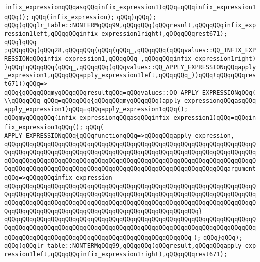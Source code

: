 \verb|infix_expressionqQQqasqQQqinfix_expression1)qQQq=qQQqinfix_expression1qQQq();|\newline
\verb|qQQq(infix_expression);|\newline
\verb|qQQq}qQQq);|\newline
\verb|qQQq(qQQqlr_table::NONTERMqQQq99,qQQqqQQq(qQQqresult,qQQqqQQqinfix_expression1left,qQQqqQQqinfix_expression1right),qQQqqQQqrest671);|\newline
\verb|qQQq}qQQq|\newline
\verb|;qQQqqQQq(qQQq28,qQQqqQQq(qQQq(qQQq_,qQQqqQQq(qQQqvalues::QQ_INFIX_EXPRESSIONqQQqinfix_expression1,qQQqqQQq_,qQQqqQQqinfix_expression1right))qQQq!qQQqqQQq(qQQq_,qQQqqQQq(qQQqvalues::QQ_APPLY_EXPRESSIONqQQqapply_expression1,qQQqqQQqapply_expression1left,qQQqqQQq_))qQQq!qQQqqQQqrest671))qQQq=>|\newline
\verb|qQQq{qQQqqQQqmyqQQqqQQqresultqQQq=qQQqvalues::QQ_APPLY_EXPRESSIONqQQq(\\qQQqqQQq_qQQq=qQQqqQQq{qQQqqQQqmyqQQqqQQq(apply_expressionqQQqasqQQqapply_expression1)qQQq=qQQqapply_expression1qQQq();|\newline
\verb|qQQqmyqQQqqQQq(infix_expressionqQQqasqQQqinfix_expression1)qQQq=qQQqinfix_expression1qQQq();|\newline
\verb|qQQq(|\newline
\verb|APPLY_EXPRESSIONqQQq{qQQqfunctionqQQq=>qQQqqQQqapply_expression,|\newline
\verb|qQQqqQQqqQQqqQQqqQQqqQQqqQQqqQQqqQQqqQQqqQQqqQQqqQQqqQQqqQQqqQQqqQQqqQQqqQQqqQQqqQQqqQQqqQQqqQQqqQQqqQQqqQQqqQQqqQQqqQQqqQQqqQQqqQQqqQQqqQQqqQQqqQQqqQQqqQQqqQQqqQQqqQQqqQQqqQQqqQQqqQQqqQQqqQQqqQQqqQQqqQQqqQQqqQQqqQQqqQQqqQQqqQQqqQQqqQQqqQQqqQQqqQQqqQQqqQQqqQQqqQQqqQQqqQQqargumentqQQq=>qQQqqQQqinfix_expression|\newline
\verb|qQQqqQQqqQQqqQQqqQQqqQQqqQQqqQQqqQQqqQQqqQQqqQQqqQQqqQQqqQQqqQQqqQQqqQQqqQQqqQQqqQQqqQQqqQQqqQQqqQQqqQQqqQQqqQQqqQQqqQQqqQQqqQQqqQQqqQQqqQQqqQQqqQQqqQQqqQQqqQQqqQQqqQQqqQQqqQQqqQQqqQQqqQQqqQQqqQQqqQQqqQQqqQQqqQQqqQQqqQQqqQQqqQQqqQQqqQQqqQQqqQQqqQQqqQQqqQQqqQQqqQQq}|\newline
\verb|qQQqqQQqqQQqqQQqqQQqqQQqqQQqqQQqqQQqqQQqqQQqqQQqqQQqqQQqqQQqqQQqqQQqqQQqqQQqqQQqqQQqqQQqqQQqqQQqqQQqqQQqqQQqqQQqqQQqqQQqqQQqqQQqqQQqqQQqqQQqqQQqqQQqqQQqqQQqqQQqqQQqqQQqqQQqqQQqqQQqqQQqqQQqqQQq|\newline
\verb|);|\newline
\verb|qQQq}qQQq);|\newline
\verb|qQQq(qQQqlr_table::NONTERMqQQq99,qQQqqQQq(qQQqresult,qQQqqQQqapply_expression1left,qQQqqQQqinfix_expression1right),qQQqqQQqrest671);|\newline
